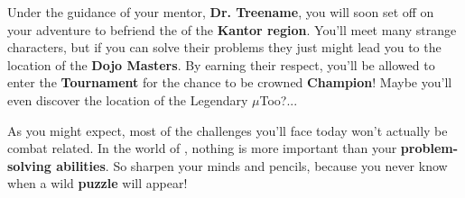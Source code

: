 Under the guidance of your mentor, \textbf{Dr. Treename}, you will soon set off
on your adventure to befriend the \mappMobimon{} of the \textbf{Kantor region}.
You'll meet many strange characters, but if you can solve their problems
they just might lead you to the location of the \textbf{Dojo Masters}.
By earning their respect, you'll be allowed to enter the
\textbf{\mappMobimon{} Tournament} for the chance to be crowned
\textbf{\mappMobimon{} Champion}! Maybe you'll even discover the location
of the Legendary \mappMobimon{} \(\mu\)Too?...

As you might expect, most of the challenges you'll face today won't actually
be combat related. In the world of \mappMobimon{}, nothing is more important
than your \textbf{problem-solving abilities}. So sharpen your minds and
pencils, because you never know when a wild \textbf{puzzle} will appear!



